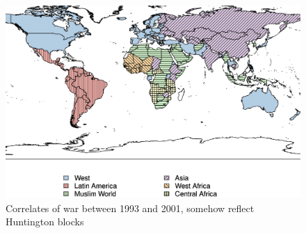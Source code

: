 \documentclass[final,xcolor=svgnames,A4]{beamer}
\begin{document}
\begin{frame}
	\begin{figure}[h]
		\centering
		\includegraphics[width=0.8\linewidth]{world.png}
		\caption{Correlates of war between 1993 and 2001, somehow reflect
			Huntington blocks \autocite{Traag2009}}
	\end{figure}
\end{frame}
\end{document}

